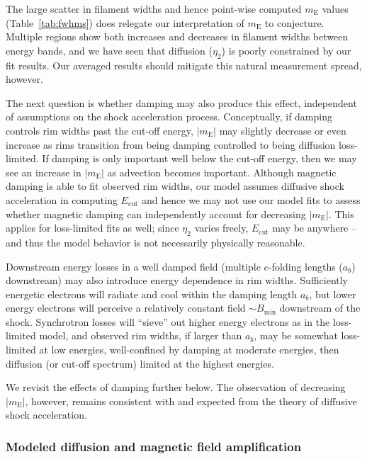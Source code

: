 \documentclass[iop, apj, numberedappendix]{emulateapj}
\newcommand*{\mt}{\mathrm}
\newcommand*{\abt}{\mathord{\sim}} %
\newcommand*{\mE}{m_\mt{E}}
\newcommand*{\Ecut}{E_{\mt{cut}}}
\newcommand*{\Bmin}{B_{\mt{min}}}
\begin{document}

The large scatter in filament widths and hence point-wise computed $\mE$ values
(Table~\ref{tab:fwhms}) does relegate our interpretation of $\mE$ to conjecture.
Multiple regions show both increases and decreases in filament widths between
energy bands, and we have seen that diffusion ($\eta_2$) is poorly constrained
by our fit results.  Our averaged results should mitigate this natural
measurement spread, however.

The next question is whether damping may also produce this effect, independent
of assumptions on the shock acceleration process.  Conceptually, if damping
controls rim widths past the cut-off energy, $|\mE|$ may slightly decrease or
even increase as rims transition from being damping controlled to being
diffusion loss-limited.  If damping is only important well below the cut-off
energy, then we may see an increase in $|\mE|$ as advection becomes important.
Although magnetic damping is able to fit observed rim widths, our model assumes
diffusive shock acceleration in computing $\Ecut$ and hence we may not use our
model fits to assess whether magnetic damping can independently account for
decreasing $|\mE|$.  This applies for loss-limited fits as well; since $\eta_2$
varies freely, $\Ecut$ may be anywhere -- and thus the model behavior is not
necessarily physically reasonable.

Downstream energy losses in a well damped field (multiple $e$-folding
lengths ($a_b$) downstream) may also introduce energy dependence in rim widths.
Sufficiently energetic electrons will radiate and cool within the damping
length $a_b$, but lower energy electrons will perceive a relatively constant
field $\abt \Bmin$ downstream of the shock.  Synchrotron losses will
``sieve'' out higher energy electrons as in the loss-limited model, and
observed rim widths, if larger than $a_b$, may be somewhat loss-limited at low
energies, well-confined by damping at moderate energies, then diffusion (or
cut-off spectrum) limited at the highest energies.

We revisit the effects of damping further below.  The observation of decreasing
$|\mE|$, however, remains consistent with and expected from the theory of
diffusive shock acceleration.

\subsubsection{Modeled diffusion and magnetic field amplification}
\end{document}
